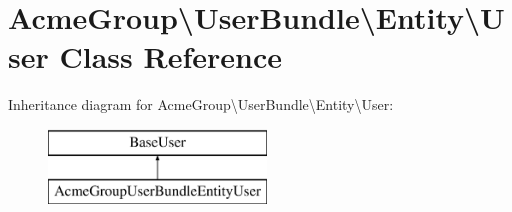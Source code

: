 \hypertarget{class_acme_group_1_1_user_bundle_1_1_entity_1_1_user}{\section{Acme\+Group\textbackslash{}User\+Bundle\textbackslash{}Entity\textbackslash{}User Class Reference}
\label{class_acme_group_1_1_user_bundle_1_1_entity_1_1_user}
}
Inheritance diagram for Acme\+Group\textbackslash{}User\+Bundle\textbackslash{}Entity\textbackslash{}User\+:\begin{figure}[H]
\begin{center}
\leavevmode
\includegraphics[height=2.000000cm]{class_acme_group_1_1_user_bundle_1_1_entity_1_1_user}
\end{center}
\end{figure}
